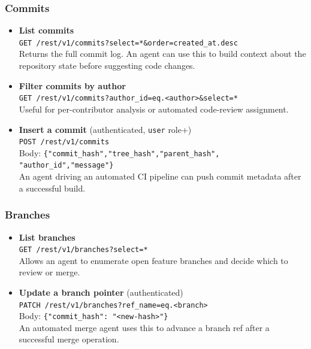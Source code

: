\documentclass{article}
\begin{document}
\subsubsection{Commits}

\begin{itemize}
    \item \textbf{List commits}\\
          \texttt{GET /rest/v1/commits?select=*\&order=created\_at.desc}\\
          Returns the full commit log.  An agent can use this to build
          context about the repository state before suggesting code changes.

    \item \textbf{Filter commits by author}\\
          \texttt{GET /rest/v1/commits?author\_id=eq.<author>\&select=*}\\
          Useful for per-contributor analysis or automated code-review
          assignment.

    \item \textbf{Insert a commit} (authenticated, \texttt{user} role+)\\
          \texttt{POST /rest/v1/commits}\\
          Body: \texttt{\{"commit\_hash","tree\_hash","parent\_hash",
          "author\_id","message"\}}\\
          An agent driving an automated CI pipeline can push commit
          metadata after a successful build.
\end{itemize}

\subsubsection{Branches}

\begin{itemize}
    \item \textbf{List branches}\\
          \texttt{GET /rest/v1/branches?select=*}\\
          Allows an agent to enumerate open feature branches and decide
          which to review or merge.

    \item \textbf{Update a branch pointer} (authenticated)\\
          \texttt{PATCH /rest/v1/branches?ref\_name=eq.<branch>}\\
          Body: \texttt{\{"commit\_hash": "<new-hash>"\}}\\
          An automated merge agent uses this to advance a branch ref after
          a successful merge operation.
\end{itemize}
\end{document}
